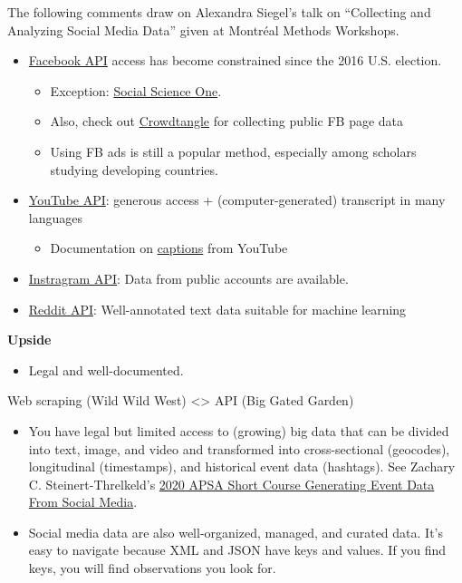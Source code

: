 \documentclass[
]{book}
\providecommand{\tightlist}{%
  \setlength{\itemsep}{0pt}\setlength{\parskip}{0pt}}
\begin{document}
The following comments draw on Alexandra Siegel's talk on ``Collecting and Analyzing Social Media Data'' given at Montréal Methods Workshops.

\begin{itemize}
\item
  \href{https://developers.facebook.com/}{Facebook API} access has become constrained since the 2016 U.S. election.

  \begin{itemize}
  \item
    Exception: \href{https://socialscience.one/blog/unprecedented-facebook-urls-dataset-now-available-research-through-social-science-one}{Social Science One}.
  \item
    Also, check out \href{https://www.crowdtangle.com/}{Crowdtangle} for collecting public FB page data
  \item
    Using FB ads is still a popular method, especially among scholars studying developing countries.
  \end{itemize}
\item
  \href{https://developers.google.com/youtube/v3}{YouTube API}: generous access + (computer-generated) transcript in many languages

  \begin{itemize}
  \tightlist
  \item
    Documentation on \href{https://developers.google.com/youtube/v3/docs/captions}{captions} from YouTube
  \end{itemize}
\item
  \href{https://www.instagram.com/developer/}{Instragram API}: Data from public accounts are available.
\item
  \href{https://www.reddit.com/dev/api/}{Reddit API}: Well-annotated text data suitable for machine learning
\end{itemize}

\textbf{Upside}

\begin{itemize}
\tightlist
\item
  Legal and well-documented.
\end{itemize}

Web scraping (Wild Wild West) \textless\textgreater{} API (Big Gated Garden)

\begin{itemize}
\item
  You have legal but limited access to (growing) big data that can be divided into text, image, and video and transformed into cross-sectional (geocodes), longitudinal (timestamps), and historical event data (hashtags). See Zachary C. Steinert-Threlkeld's \href{https://github.com/ZacharyST/APSA2020_EventDataFromSocialMedia}{2020 APSA Short Course Generating Event Data From Social Media}.
\item
  Social media data are also well-organized, managed, and curated data. It's easy to navigate because XML and JSON have keys and values. If you find keys, you will find observations you look for.
\end{itemize}
\end{document}
